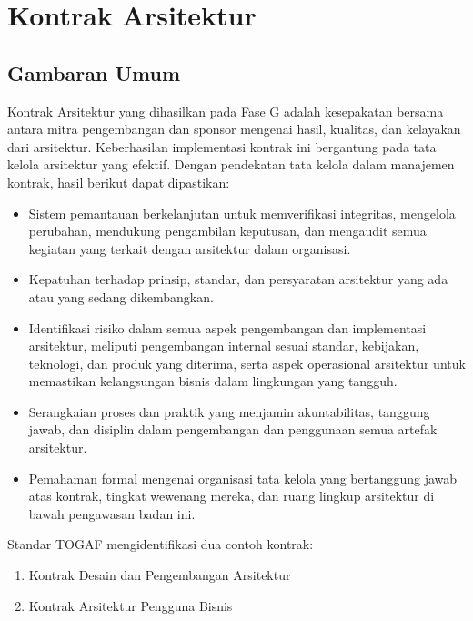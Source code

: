 \section{Kontrak Arsitektur}

\subsection{Gambaran Umum}
Kontrak Arsitektur yang dihasilkan pada Fase G adalah kesepakatan bersama antara mitra pengembangan dan sponsor mengenai hasil, kualitas, dan kelayakan dari arsitektur. Keberhasilan implementasi kontrak ini bergantung pada tata kelola arsitektur yang efektif. Dengan pendekatan tata kelola dalam manajemen kontrak, hasil berikut dapat dipastikan:

\begin{itemize}
	\item Sistem pemantauan berkelanjutan untuk memverifikasi integritas, mengelola perubahan, mendukung pengambilan keputusan, dan mengaudit semua kegiatan yang terkait dengan arsitektur dalam organisasi.
	\item Kepatuhan terhadap prinsip, standar, dan persyaratan arsitektur yang ada atau yang sedang dikembangkan.
	\item Identifikasi risiko dalam semua aspek pengembangan dan implementasi arsitektur, meliputi pengembangan internal sesuai standar, kebijakan, teknologi, dan produk yang diterima, serta aspek operasional arsitektur untuk memastikan kelangsungan bisnis dalam lingkungan yang tangguh.
	\item Serangkaian proses dan praktik yang menjamin akuntabilitas, tanggung jawab, dan disiplin dalam pengembangan dan penggunaan semua artefak arsitektur.
	\item Pemahaman formal mengenai organisasi tata kelola yang bertanggung jawab atas kontrak, tingkat wewenang mereka, dan ruang lingkup arsitektur di bawah pengawasan badan ini.
\end{itemize}

Standar TOGAF mengidentifikasi dua contoh kontrak:
\begin{enumerate}
	\item Kontrak Desain dan Pengembangan Arsitektur
	\item Kontrak Arsitektur Pengguna Bisnis
\end{enumerate}


